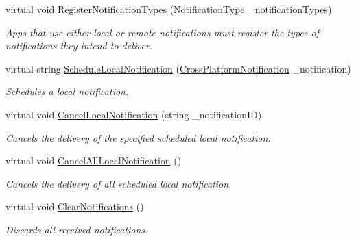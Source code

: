 \begin{DoxyCompactItemize}
\item 
virtual void \hyperlink{class_voxel_busters_1_1_native_plugins_1_1_notification_service_a83e1d708241a024ce3994443c3d30d78}{Register\+Notification\+Types} (\hyperlink{namespace_voxel_busters_1_1_native_plugins_a25a31a4bdc02a0d0adb743e26dd14ba9}{Notification\+Type} \+\_\+notification\+Types)
\begin{DoxyCompactList}\small\item\em Apps that use either local or remote notifications must register the types of notifications they intend to deliver. \end{DoxyCompactList}\item 
virtual string \hyperlink{class_voxel_busters_1_1_native_plugins_1_1_notification_service_ab8eaf2bbfef786a88b9556e881c61ecd}{Schedule\+Local\+Notification} (\hyperlink{class_voxel_busters_1_1_native_plugins_1_1_cross_platform_notification}{Cross\+Platform\+Notification} \+\_\+notification)
\begin{DoxyCompactList}\small\item\em Schedules a local notification. \end{DoxyCompactList}\item 
virtual void \hyperlink{class_voxel_busters_1_1_native_plugins_1_1_notification_service_a6ec99b73a3dc7fbdd9069eec0bfc961c}{Cancel\+Local\+Notification} (string \+\_\+notification\+I\+D)
\begin{DoxyCompactList}\small\item\em Cancels the delivery of the specified scheduled local notification. \end{DoxyCompactList}\item 
virtual void \hyperlink{class_voxel_busters_1_1_native_plugins_1_1_notification_service_a677dbcbc871e2bad7d247fa7eab1918e}{Cancel\+All\+Local\+Notification} ()
\begin{DoxyCompactList}\small\item\em Cancels the delivery of all scheduled local notification. \end{DoxyCompactList}\item 
virtual void \hyperlink{class_voxel_busters_1_1_native_plugins_1_1_notification_service_a68885259422119ac6697a12190e1970a}{Clear\+Notifications} ()
\begin{DoxyCompactList}\small\item\em Discards all received notifications. \end{DoxyCompactList}\item 

\end{DoxyCompactItemize}
